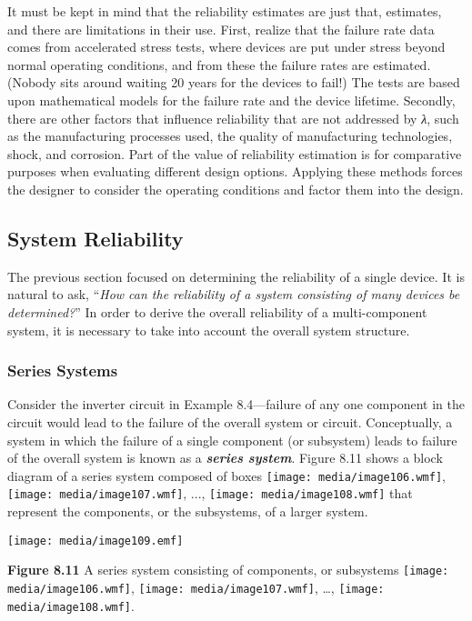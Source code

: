 It must be kept in mind that the reliability estimates are just that,
estimates, and there are limitations in their use. First, realize that
the failure rate data comes from accelerated stress tests, where devices
are put under stress beyond normal operating conditions, and from these
the failure rates are estimated. (Nobody sits around waiting 20 years
for the devices to fail!) The tests are based upon mathematical models
for the failure rate and the device lifetime. Secondly, there are other
factors that influence reliability that are not addressed by \emph{λ},
such as the manufacturing processes used, the quality of manufacturing
technologies, shock, and corrosion. Part of the value of reliability
estimation is for comparative purposes when evaluating different design
options. Applying these methods forces the designer to consider the
operating conditions and factor them into the design.

\subsection{System Reliability}\label{system-reliability-1}

The previous section focused on determining the reliability of a single
device. It is natural to ask, ``\emph{How can the reliability of a
system consisting of many devices be determined?}'' In order to derive
the overall reliability of a multi-component system, it is necessary to
take into account the overall system structure.

\subsubsection{Series Systems}\label{series-systems}

Consider the inverter circuit in Example 8.4---failure of any one
component in the circuit would lead to the failure of the overall system
or circuit. Conceptually, a system in which the failure of a single
component (or subsystem) leads to failure of the overall system is known
as a \emph{\textbf{series system}}. Figure 8.11 shows a block diagram of
a series system composed of boxes \texttt{[image: media/image106.wmf]},
\texttt{[image: media/image107.wmf]}, ...,
\texttt{[image: media/image108.wmf]} that represent the components, or
the subsystems, of a larger system.

\texttt{[image: media/image109.emf]}

\textbf{Figure 8.11} A series system consisting of components, or
subsystems \texttt{[image: media/image106.wmf]},
\texttt{[image: media/image107.wmf]}, \ldots,
\texttt{[image: media/image108.wmf]}.

